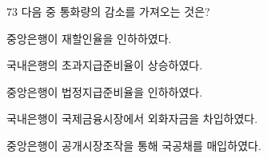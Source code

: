 \begin{question}{73}
다음 중 통화량의 감소를 가져오는 것은?
\begin{choices}
  \item 중앙은행이 재할인율을 인하하였다.
  \item 국내은행의 초과지급준비율이 상승하였다.
  \item 중앙은행이 법정지급준비율을 인하하였다.
  \item 국내은행이 국제금융시장에서 외화자금을 차입하였다.
  \item 중앙은행이 공개시장조작을 통해 국공채를 매입하였다.
\end{choices}
\end{question}
